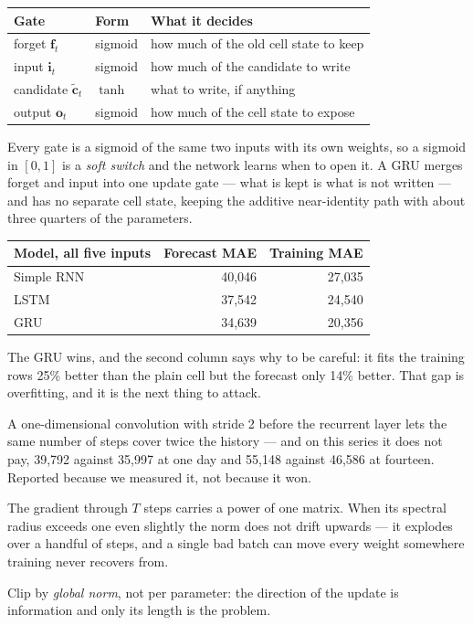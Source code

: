 \documentclass[11pt,a4paper]{article}
\begin{document}
\begin{center}
\small
\begin{tabular}{lll}
\toprule
\textbf{Gate} & \textbf{Form} & \textbf{What it decides} \\
\midrule
forget $\mathbf{f}_t$ & sigmoid & how much of the old cell state to keep \\
input $\mathbf{i}_t$ & sigmoid & how much of the candidate to write \\
candidate $\tilde{\mathbf{c}}_t$ & $\tanh$ & what to write, if anything \\
output $\mathbf{o}_t$ & sigmoid & how much of the cell state to expose \\
\bottomrule
\end{tabular}
\end{center}

Every gate is a sigmoid of the same two inputs with its own weights, so a
sigmoid in $[0,1]$ is a \emph{soft switch} and the network learns when to open
it. A GRU merges forget and input into one update gate --- what is kept is what
is not written --- and has no separate cell state, keeping the additive
near-identity path with about three quarters of the parameters.

\begin{center}
\small
\begin{tabular}{lrr}
\toprule
\textbf{Model, all five inputs} & \textbf{Forecast MAE} &
\textbf{Training MAE} \\
\midrule
Simple RNN & 40{,}046 & 27{,}035 \\
LSTM & 37{,}542 & 24{,}540 \\
GRU & 34{,}639 & 20{,}356 \\
\bottomrule
\end{tabular}
\end{center}

The GRU wins, and the second column says why to be careful: it fits the
training rows 25\% better than the plain cell but the forecast only 14\%
better. That gap is overfitting, and it is the next thing to attack.

A one-dimensional convolution with stride 2 before the recurrent layer lets the
same number of steps cover twice the history --- and on this series it does not
pay, 39{,}792 against 35{,}997 at one day and 55{,}148 against 46{,}586 at
fourteen. Reported because we measured it, not because it won.

\begin{keybox}[title={Gradient clipping is not optional here}]
The gradient through $T$ steps carries a power of one matrix. When its spectral
radius exceeds one even slightly the norm does not drift upwards --- it
explodes over a handful of steps, and a single bad batch can move every weight
somewhere training never recovers from.

Clip by \emph{global norm}, not per parameter: the direction of the update is
information and only its length is the problem.
\end{keybox}
\end{document}
